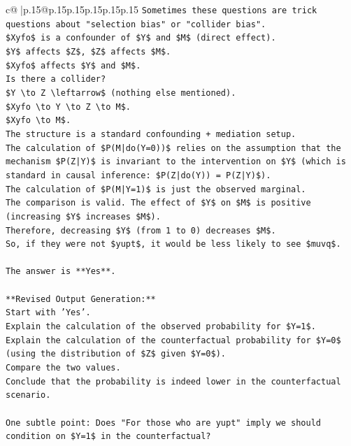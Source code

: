 \documentclass{article}
\begin{document}
{\begin{supertabular}{c@{$\;$}|p{.15\linewidth}@{}p{.15\linewidth}p{.15\linewidth}p{.15\linewidth}p{.15\linewidth}p{.15\linewidth}}
{{{\texttt{Sometimes these questions are trick questions about "selection bias" or "collider bias".} \\
\texttt{\$Xyfo\$ is a confounder of \$Y\$ and \$M\$ (direct effect).} \\
\texttt{\$Y\$ affects \$Z\$, \$Z\$ affects \$M\$.} \\
\texttt{\$Xyfo\$ affects \$Y\$ and \$M\$.} \\
\texttt{Is there a collider?} \\
\texttt{\$Y \textbackslash{}to Z \textbackslash{}leftarrow\$ (nothing else mentioned).} \\
\texttt{\$Xyfo \textbackslash{}to Y \textbackslash{}to Z \textbackslash{}to M\$.} \\
\texttt{\$Xyfo \textbackslash{}to M\$.} \\
\texttt{The structure is a standard confounding + mediation setup.} \\
\texttt{The calculation of \$P(M|do(Y=0))\$ relies on the assumption that the mechanism \$P(Z|Y)\$ is invariant to the intervention on \$Y\$ (which is standard in causal inference: \$P(Z|do(Y)) = P(Z|Y)\$).} \\
\texttt{The calculation of \$P(M|Y=1)\$ is just the observed marginal.} \\
\texttt{The comparison is valid. The effect of \$Y\$ on \$M\$ is positive (increasing \$Y\$ increases \$M\$).} \\
\texttt{Therefore, decreasing \$Y\$ (from 1 to 0) decreases \$M\$.} \\
\texttt{So, if they were not \$yupt\$, it would be less likely to see \$muvq\$.} \\
\\ 
\texttt{The answer is **Yes**.} \\
\\ 
\texttt{**Revised Output Generation:**} \\
\texttt{Start with 'Yes'.} \\
\texttt{Explain the calculation of the observed probability for \$Y=1\$.} \\
\texttt{Explain the calculation of the counterfactual probability for \$Y=0\$ (using the distribution of \$Z\$ given \$Y=0\$).} \\
\texttt{Compare the two values.} \\
\texttt{Conclude that the probability is indeed lower in the counterfactual scenario.} \\
\\ 
\texttt{One subtle point: Does "For those who are yupt" imply we should condition on \$Y=1\$ in the counterfactual?} \\
}}}
\end{supertabular}}
\end{document}

